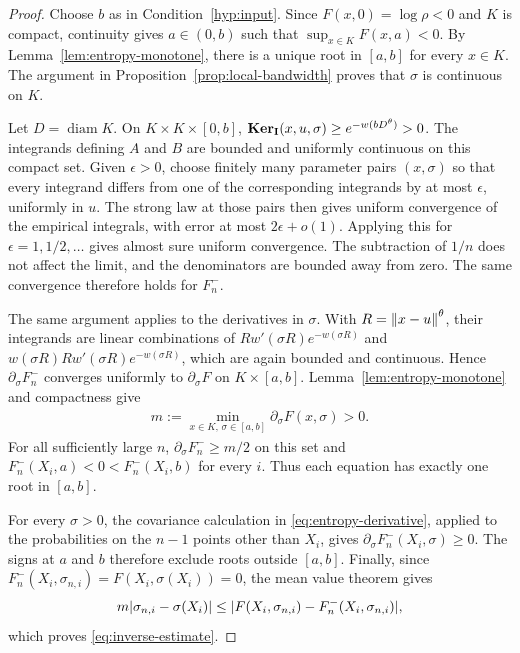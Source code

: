\begin{proof}
Choose $b$ as in Condition~\ref{hyp:input}. Since $F(x,0)=\log\rho<0$ and $K$ is compact, continuity gives $a\in(0,b)$ such that $\sup_{x\in K}F(x,a)<0$. By Lemma~\ref{lem:entropy-monotone}, there is a unique root in $[a,b]$ for every $x\in K$. The argument in Proposition~\ref{prop:local-bandwidth} proves that $\sigma$ is continuous on $K$.

Let $D=\operatorname{diam}K$. On $K\times K\times[0,b]$,
$\mathbf{Ker}_{\mathbf{I}}(x,u,\sigma)\geq e^{-w(bD^\theta)}>0$. The integrands defining $A$ and $B$ are bounded and uniformly continuous on this compact set. Given $\epsilon>0$, choose finitely many parameter pairs $(x,\sigma)$ so that every integrand differs from one of the corresponding integrands by at most $\epsilon$, uniformly in $u$. The strong law at those pairs then gives uniform convergence of the empirical integrals, with error at most $2\epsilon+o(1)$. Applying this for $\epsilon=1,1/2,\ldots$ gives almost sure uniform convergence. The subtraction of $1/n$ does not affect the limit, and the denominators are bounded away from zero. The same convergence therefore holds for $F_n^-$.

The same argument applies to the derivatives in $\sigma$. With $R=\left\lVert x-u\right\rVert^\theta$, their integrands are linear combinations of $Rw'(\sigma R)e^{-w(\sigma R)}$ and $w(\sigma R)Rw'(\sigma R)e^{-w(\sigma R)}$, which are again bounded and continuous. Hence $\partial_\sigma F_n^-$ converges uniformly to $\partial_\sigma F$ on $K\times[a,b]$. Lemma~\ref{lem:entropy-monotone} and compactness give
\begin{align}
m:=\min_{x\in K,\,\sigma\in[a,b]}\partial_\sigma F(x,\sigma)>0.
\end{align}
For all sufficiently large $n$, $\partial_\sigma F_n^-\geq m/2$ on this set and $F_n^-(X_i,a)<0<F_n^-(X_i,b)$ for every $i$. Thus each equation has exactly one root in $[a,b]$.

For every $\sigma>0$, the covariance calculation in \eqref{eq:entropy-derivative}, applied to the probabilities on the $n-1$ points other than $X_i$, gives $\partial_\sigma F_n^-(X_i,\sigma)\geq0$. The signs at $a$ and $b$ therefore exclude roots outside $[a,b]$. Finally, since $F_n^-(X_i,\sigma_{n,i})=F(X_i,\sigma(X_i))=0$, the mean value theorem gives
\begin{align}
m|\sigma_{n,i}-\sigma(X_i)|
\leq |F(X_i,\sigma_{n,i})-F_n^-(X_i,\sigma_{n,i})|,\notag
\end{align}
which proves \eqref{eq:inverse-estimate}.
\end{proof}

